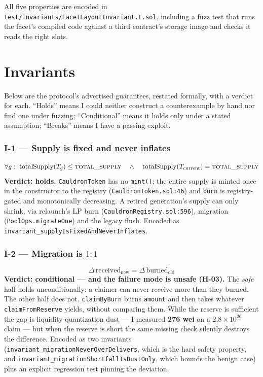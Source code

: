 \documentclass[10pt,a4paper]{article}
\newcommand{\code}[1]{\texttt{\small #1}}
\begin{document}
\noindent All five properties are encoded in
\code{test/invariants/FacetLayoutInvariant.t.sol}, including a fuzz test that
runs the facet's compiled code against a third contract's storage image and
checks it reads the right slots.

\section{Invariants}
\label{sec:invariants}

Below are the protocol's advertised guarantees, restated formally, with a
verdict for each. ``Holds'' means I could neither construct a counterexample by
hand nor find one under fuzzing; ``Conditional'' means it holds only under a
stated assumption; ``Breaks'' means I have a passing exploit.

\subsubsection*{I-1 --- Supply is fixed and never inflates}
\[
\forall g:\; \mathrm{totalSupply}(T_g) \le \textsc{total\_supply}
\quad\wedge\quad
\mathrm{totalSupply}(T_{\mathrm{current}}) = \textsc{total\_supply}
\]
\textbf{Verdict: holds.} \code{CauldronToken} has no \code{mint()}; the entire
supply is minted once in the constructor to the registry
(\code{CauldronToken.sol:46}) and \code{burn} is registry-gated and
monotonically decreasing. A retired generation's supply can only shrink, via
relaunch's LP burn (\code{CauldronRegistry.sol:596}), migration
(\code{PoolOps.migrateOne}) and the legacy flush. Encoded as
\code{invariant\_supplyIsFixedAndNeverInflates}.

\subsubsection*{I-2 --- Migration is $1{:}1$}
\[
\Delta\,\mathrm{received}_{\mathrm{new}} = \Delta\,\mathrm{burned}_{\mathrm{old}}
\]
\textbf{Verdict: conditional --- and the failure mode is unsafe
(\textbf{H-03}).} The \emph{safe} half holds unconditionally: a claimer can
never receive more than they burned. The other half does not. \code{claimByBurn}
burns \code{amount} and then takes whatever \code{claimFromReserve} yields,
without comparing them. While the reserve is sufficient the gap is
liquidity-quantization dust --- I measured \textbf{276 wei} on a
$2.8\times10^{26}$ claim --- but when the reserve is short the same missing
check silently destroys the difference. Encoded as two invariants
(\code{invariant\_migrationNeverOverDelivers}, which is the hard safety
property, and \code{invariant\_migrationShortfallIsDustOnly}, which bounds the
benign case) plus an explicit regression test pinning the deviation.
\end{document}
